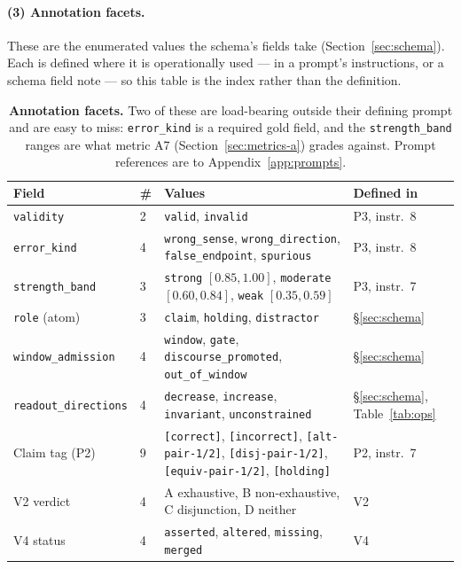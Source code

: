 \documentclass[11pt]{article}
\begin{document}
\paragraph{(3) Annotation facets.}
These are the enumerated values the schema's fields take (Section~\ref{sec:schema}). Each is
defined where it is operationally used --- in a prompt's instructions, or a schema field note ---
so this table is the index rather than the definition.

\clearpage

\begin{table}[!ht]\centering\small
\renewcommand{\arraystretch}{1.1}
\begin{tabular}{@{}llp{6.6cm}l@{}}
\toprule
\textbf{Field} & \textbf{\#} & \textbf{Values} & \textbf{Defined in}\\
\midrule
\texttt{validity}    & 2 & \texttt{valid}, \texttt{invalid} & P3, instr.\ 8\\
\texttt{error\_kind} & 4 & \texttt{wrong\_sense}, \texttt{wrong\_direction},
                           \texttt{false\_endpoint}, \texttt{spurious} & P3, instr.\ 8\\
\texttt{strength\_band} & 3 & \texttt{strong} $[0.85,1.00]$, \texttt{moderate} $[0.60,0.84]$,
                              \texttt{weak} $[0.35,0.59]$ & P3, instr.\ 7\\
\texttt{role} (atom) & 3 & \texttt{claim}, \texttt{holding}, \texttt{distractor} &
                           \S\ref{sec:schema}\\
\texttt{window\_admission} & 4 & \texttt{window}, \texttt{gate},
                                 \texttt{discourse\_promoted}, \texttt{out\_of\_window} &
                                 \S\ref{sec:schema}\\
\texttt{readout\_directions} & 4 & \texttt{decrease}, \texttt{increase}, \texttt{invariant},
                                   \texttt{unconstrained} & \S\ref{sec:schema},
                                   Table~\ref{tab:ops}\\
Claim tag (P2)       & 9 & \texttt{[correct]}, \texttt{[incorrect]}, \texttt{[alt-pair-1/2]},
                           \texttt{[disj-pair-1/2]}, \texttt{[equiv-pair-1/2]},
                           \texttt{[holding]} & P2, instr.\ 7\\
V2 verdict           & 4 & A exhaustive, B non-exhaustive, C disjunction, D neither &
                           V2\\
V4 status            & 4 & \texttt{asserted}, \texttt{altered}, \texttt{missing},
                           \texttt{merged} & V4\\
\bottomrule
\end{tabular}
\caption{\textbf{Annotation facets.} Two of these are load-bearing outside their defining
prompt and are easy to miss: \texttt{error\_kind} is a required gold field, and the
\texttt{strength\_band} ranges are what metric A7 (Section~\ref{sec:metrics-a}) grades against.
Prompt references are to Appendix~\ref{app:prompts}.}
\label{tab:facetann}
\end{table}
\end{document}
